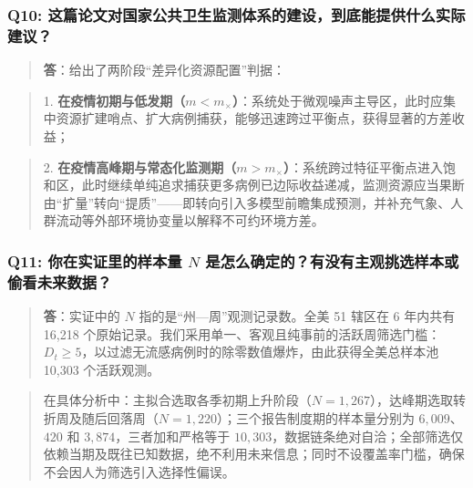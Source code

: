 \documentclass[11pt,a4paper]{ctexart}
\begin{document}
\subsubsection{Q10: 这篇论文对国家公共卫生监测体系的建设，到底能提供什么实际建议？}
\begin{quote}\small\color{black!75}
\textbf{答}：给出了两阶段“差异化资源配置”判据：
\end{quote}
\begin{quote}\small\color{black!75}
1. \textbf{在疫情初期与低发期（$m < m_\times$）}：系统处于微观噪声主导区，此时应集中资源扩建哨点、扩大病例捕获，能够迅速跨过平衡点，获得显著的方差收益；
\end{quote}
\begin{quote}\small\color{black!75}
2. \textbf{在疫情高峰期与常态化监测期（$m > m_\times$）}：系统跨过特征平衡点进入饱和区，此时继续单纯追求捕获更多病例已边际收益递减，监测资源应当果断由“扩量”转向“提质”——即转向引入多模型前瞻集成预测，并补充气象、人群流动等外部环境协变量以解释不可约环境方差。
\end{quote}

\subsubsection{Q11: 你在实证里的样本量 $N$ 是怎么确定的？有没有主观挑选样本或偷看未来数据？}
\begin{quote}\small\color{black!75}
\textbf{答}：实证中的 $N$ 指的是“州—周”观测记录数。全美 51 辖区在 6 年内共有 16,218 个原始记录。我们采用单一、客观且纯事前的活跃周筛选门槛：$D_t \ge 5$，以过滤无流感病例时的除零数值爆炸，由此获得全美总样本池 10,303 个活跃观测。
\end{quote}
\begin{quote}\small\color{black!75}
在具体分析中：主拟合选取各季初期上升阶段（$N = 1,267$），达峰期选取转折周及随后回落周（$N = 1,220$）；三个报告制度期的样本量分别为 $6,009$、$420$ 和 $3,874$，三者加和严格等于 $10,303$，数据链条绝对自洽；全部筛选仅依赖当期及既往已知数据，绝不利用未来信息；同时不设覆盖率门槛，确保不会因人为筛选引入选择性偏误。
\end{quote}
\end{document}
